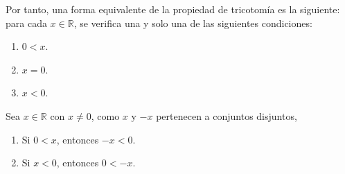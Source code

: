 \documentclass[11pt]{article}
\newcommand{\R}{\mathbb{R}}
\newcommand{\defined}{\coloneqq}
\newcommand{\bfit}[1]{\textbf{\textit{#1}}}
\let\set\Set
\begin{document}
%
Por tanto, una forma equivalente de la propiedad de tricotomía es la siguiente: para cada $x\in \R$, se verifica una y solo una de las siguientes condiciones:\vspace{-1em} \begin{enumerate}[label=\roman*)]
    \item $0<x$.
    \item $x=0$.
    \item $x<0$.
\end{enumerate}\vspace{-1em}

Sea $x\in \R$ con $x\neq 0$, como $x$ y $-x$ pertenecen a conjuntos disjuntos,\vspace{-1em}\begin{enumerate}[label=\roman*)]
\item Si $0<x$, entonces $-x<0$.
\item Si $x<0$, entonces $0<-x$.
\end{enumerate}\vspace{-1em}
\end{document}
